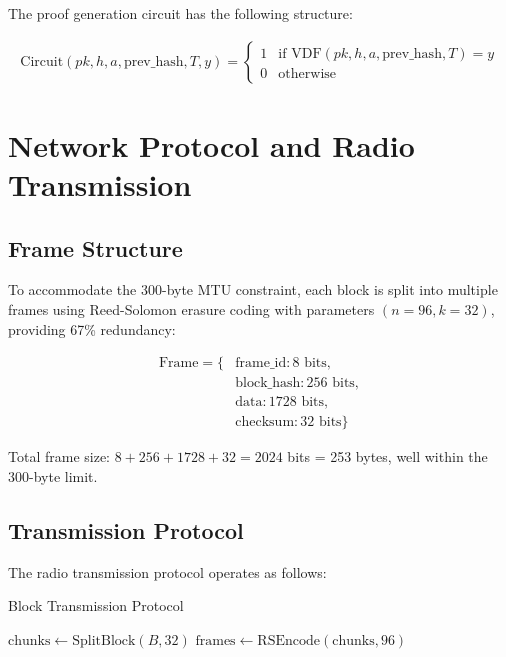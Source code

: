 \documentclass[11pt,a4paper]{article}
\begin{document}
The proof generation circuit has the following structure:

\begin{align}
\text{Circuit}(pk, h, a, \text{prev\_hash}, T, y) = \begin{cases}
1 & \text{if } \text{VDF}(pk, h, a, \text{prev\_hash}, T) = y \\
0 & \text{otherwise}
\end{cases}
\end{align}

\section{Network Protocol and Radio Transmission}

\subsection{Frame Structure}

To accommodate the 300-byte MTU constraint, each block is split into multiple frames using Reed-Solomon erasure coding with parameters $(n=96, k=32)$, providing 67\% redundancy:

\begin{align}
\text{Frame} = \{&\text{frame\_id}: 8 \text{ bits},\\
&\text{block\_hash}: 256 \text{ bits},\\
&\text{data}: 1728 \text{ bits},\\
&\text{checksum}: 32 \text{ bits}\}
\end{align}

Total frame size: $8 + 256 + 1728 + 32 = 2024$ bits = 253 bytes, well within the 300-byte limit.

\subsection{Transmission Protocol}

The radio transmission protocol operates as follows:

\begin{algorithm}[H]
\SetAlgoLined
{}
\caption{Block Transmission Protocol}

$\text{chunks} \leftarrow \text{SplitBlock}(B, 32)$\;
$\text{frames} \leftarrow \text{RSEncode}(\text{chunks}, 96)$\;

\end{algorithm}
\end{document}
